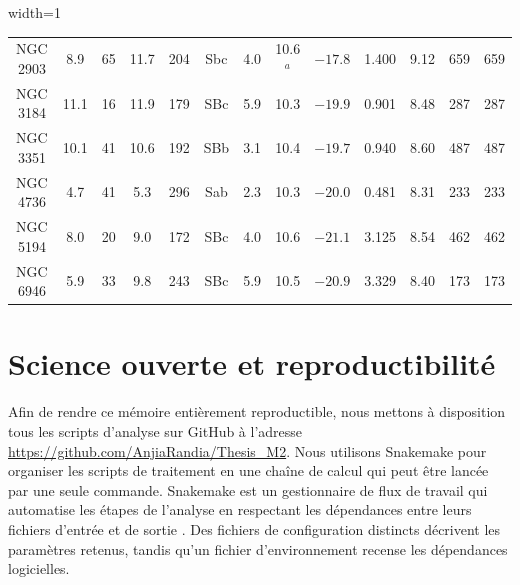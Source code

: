 \begin{table}[htbp]
\begin{adjustbox}{width=1\textwidth}
\begin{tabular}{|ccccccccccccc|}
			NGC 2903 & 8.9 & 65 & 11.7 & 204 & Sbc &4.0& 10.6$^a$ & $-17.8$ &1.400& 9.12 & 659 & 659 \\
			NGC 3184 & 11.1 & 16 & 11.9 & 179 & SBc &5.9& 10.3 & $-19.9$ &0.901& 8.48 & 287 & 287 \\
			NGC 3351 & 10.1 & 41 & 10.6 & 192 & SBb &3.1& 10.4 & $-19.7$ &0.940& 8.60 & 487 & 487 \\
			NGC 4736 & 4.7 & 41 & 5.3 & 296 & Sab &2.3& 10.3 & $-20.0$ &0.481& 8.31 & 233 & 233 \\
			NGC 5194 & 8.0 & 20 & 9.0 & 172 & SBc &4.0& 10.6 & $-21.1$ &3.125& 8.54 & 462 & 462 \\
			NGC 6946 & 5.9 & 33 & 9.8 & 243 & SBc &5.9& 10.5 & $-20.9$ &3.329& 8.40 & 173 & 173 \\
			\hline\hline
			
			
			
		\end{tabular}
		
	\end{adjustbox}
	\label{tab:galaxy_sample}
\end{table}

\clearpage
\section[Science ouverte et reproductibilité]{Science ouverte et reproductibilité}
\label{sec:reproducibility}

Afin de rendre ce mémoire entièrement reproductible, nous mettons à disposition tous les scripts d'analyse sur GitHub à l'adresse \url{https://github.com/AnjiaRandia/Thesis_M2}. Nous utilisons Snakemake pour organiser les scripts de traitement en une chaîne de calcul qui peut être lancée par une seule commande. Snakemake est un gestionnaire de flux de travail qui automatise les étapes de l'analyse en respectant les dépendances entre leurs fichiers d'entrée et de sortie \citep{Molder2021}. Des fichiers de configuration distincts décrivent les paramètres retenus, tandis qu'un fichier d'environnement recense les dépendances logicielles.

